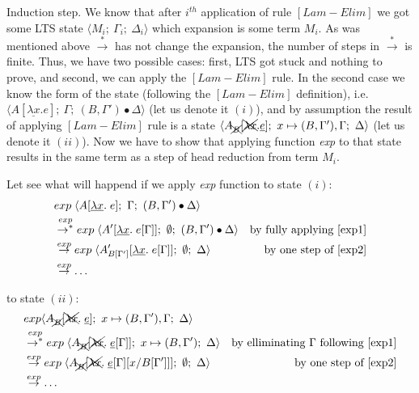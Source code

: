 \documentclass[a4paper, 10pt]{article}
\begin{document}
Induction step. We know that after $i^{th}$ application of rule $[Lam-Elim]$ we got some LTS state $\langle M_i;\ \Gamma_i;\ \Delta_i \rangle$ which expansion is some term $M_i$. As was mentioned above $\overset{*}{\rightarrow}$ has not change the expansion, the number of steps in $\overset{*}{\rightarrow}$ is finite. Thus, we have two possible cases:
first, LTS got stuck and nothing to prove, and second, we can apply the $[Lam-Elim]$ rule. In the second case we know the form of the state (following the $[Lam-Elim]$ definition), i.e. $\langle A[\underline{\lambda x}. e];\ \Gamma;\ (B,\Gamma')\bullet\Delta \rangle$ (let us denote it $(i)$), and by assumption the result of applying $[Lam-Elim]$ rule is a state $\langle A_{\xcancel{B}}[\xcancel{\lambda x}.\underline{e}];\ x \mapsto (B,\Gamma'),\Gamma;\ \Delta \rangle$ (let us denote it $(ii)$). Now we have to show that applying function \emph{exp} to that state results in the same term as a step of head reduction from term $M_i$.

Let see what will happend if we apply \emph{exp} function to state $(i)$:
\begin{align}
  &exp\; \langle A[\underline{\lambda x}.\; e];\ \Gamma;\ (B,\Gamma')\bullet\Delta \rangle & \\
  &\overset{exp}{\rightarrow^{*}}
  exp\; \langle A'[\underline{\lambda x}.\; e[\Gamma]];\ \emptyset;\ (B,\Gamma')\bullet\Delta \rangle &\textnormal{by fully applying \eqref{exp1}} \\
  \label{i3} &\overset{exp}{\rightarrow}
  exp\; \langle A'_{B[\Gamma']}[\underline{\lambda x}.\; e[\Gamma]];\ \emptyset;\ \Delta \rangle &\textnormal{by one step of \eqref{exp2}} \\
  &\overset{exp}{\rightarrow}
  \dots &
\end{align}

to state $(ii)$:
\begin{align}
  &exp \langle A_{\xcancel{B}}[\xcancel{\lambda x}.\; \underline{e}];\ x \mapsto (B,\Gamma'),\Gamma;\ \Delta \rangle & \\
  &\overset{exp}{\rightarrow^{*}}
  exp\;\langle A_{\xcancel{B}}[\xcancel{\lambda x}.\; \underline{e}[\Gamma]];\ x \mapsto (B,\Gamma');\ \Delta \rangle &\textnormal{by elliminating $\Gamma$ following \eqref{exp1}} \\
  \label{ii3} &\overset{exp}{\rightarrow}
  exp\; \langle A_{\xcancel{B}}[\xcancel{\lambda x}.\; \underline{e}[\Gamma][x/B[\Gamma']]];\ \emptyset;\ \Delta \rangle &\textnormal{by one step of \eqref{exp2}} \\
  &\overset{exp}{\rightarrow}
  \dots &
\end{align}
\end{document}

